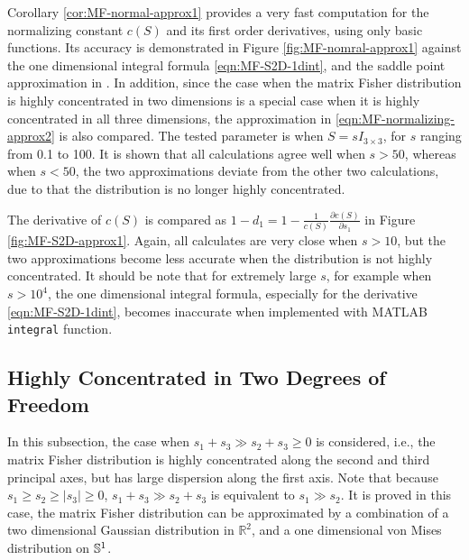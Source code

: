 Corollary \ref{cor:MF-normal-approx1} provides a very fast computation for the normalizing constant $c(S)$ and its first order derivatives, using only basic functions.
Its accuracy is demonstrated in Figure \ref{fig:MF-nomral-approx1} against the one dimensional integral formula \eqref{eqn:MF-S2D-1dint}, and the saddle point approximation in \cite{kume2005saddlepoint}.
In addition, since the case when the matrix Fisher distribution is highly concentrated in two dimensions is a special case when it is highly concentrated in all three dimensions, the approximation in \eqref{eqn:MF-normalizing-approx2} is also compared.
The tested parameter is when $S = sI_{3\times 3}$, for $s$ ranging from 0.1 to 100.
It is shown that all calculations agree well when $s > 50$, whereas when $s < 50$, the two approximations deviate from the other two calculations, due to that the distribution is no longer highly concentrated.

The derivative of $c(S)$ is compared as $1-d_1 = 1-\tfrac{1}{c(S)} \tfrac{\partial c(S)}{\partial s_1}$ in Figure \ref{fig:MF-S2D-approx1}.
Again, all calculates are very close when $s>10$, but the two approximations become less accurate when the distribution is not highly concentrated.
It should be note that for extremely large $s$, for example when $s > 10^4$, the one dimensional integral formula, especially for the derivative \ref{eqn:MF-S2D-1dint}, becomes inaccurate when implemented with MATLAB \texttt{integral} function.

\subsection{Highly Concentrated in Two Degrees of Freedom} \label{section:MF-approx-2}

In this subsection, the case when $s_1+s_3\gg s_2+s_3 \geq 0$ is considered, i.e., the matrix Fisher distribution is highly concentrated along the second and third principal axes, but has large dispersion along the first axis.
Note that because $s_1 \geq s_2 \geq |s_3| \geq 0$, $s_1+s_3\gg s_2+s_3$ is equivalent to $s_1 \gg s_2$.
It is proved in this case, the matrix Fisher distribution can be approximated by a combination of a two dimensional Gaussian distribution in $\mathbb{R}^2$, and a one dimensional von Mises distribution on $\mathbb{S}^1$.

